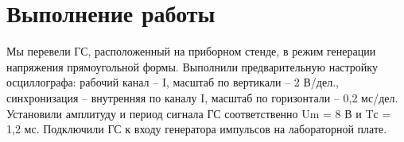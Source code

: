 \section{Выполнение работы}

Мы перевели ГС, расположенный на приборном стенде, в режим
генерации напряжения прямоугольной формы. Выполнили предварительную
настройку осциллографа: рабочий канал – I, масштаб по вертикали – 2
В/дел., синхронизация – внутренняя по каналу I, масштаб по горизонтали
– 0,2 мс/дел. Установили амплитуду и период
сигнала ГС соответственно Um = 8 В и Tс = 1,2 мс. Подключили ГС к
входу генератора импульсов на лабораторной плате.


\newpage

\newpage

